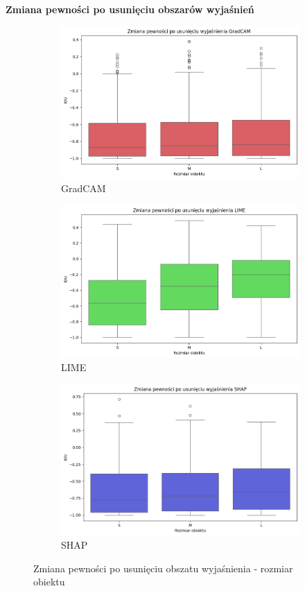 \textbf{Zmiana pewności po usunięciu obszarów wyjaśnień}
\begin{figure}
	\centering
	\begin{subfigure}[b]{0.3\textwidth}
		\centering\includegraphics[width=.9\textwidth]{img/size_confidence_no_exp_gradcam}
		\caption{GradCAM}  \label{rys:size_confidence_no_exp_gradcam}
	\end{subfigure}
	\begin{subfigure}[b]{0.3\textwidth}
		\centering\includegraphics[width=.9\textwidth]{img/size_confidence_no_exp_lime}
		\caption{LIME}  \label{rys:size_confidence_no_exp_lime}
	\end{subfigure}
	\begin{subfigure}[b]{0.3\textwidth}
		\centering\includegraphics[width=.9\textwidth]{img/size_confidence_no_exp_shap}
		\caption{SHAP}  \label{rys:size_confidence_no_exp_shap}
	\end{subfigure}
	\caption{Zmiana pewności po usunięciu obszatu wyjaśnienia - rozmiar obiektu}
\end{figure}


